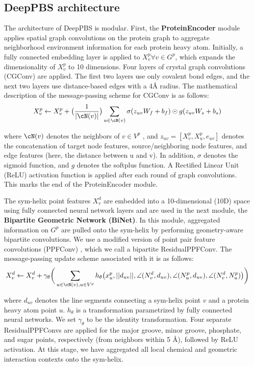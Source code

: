 \subsection{DeepPBS architecture}
The architecture of DeepPBS is modular. First, the \textbf{ProteinEncoder} module applies spatial graph convolutions on the protein graph to aggregate neighborhood environment information for each protein heavy atom. Initially, a fully connected embedding layer is applied to $X_v^p \forall v \in G^p$, which expands the dimensionality of $X_v^p$ to 10 dimensions. Four layers of crystal graph convolutions (CGConv)\citep{Xie2018} are applied. The first two layers use only covalent bond edges, and the next two layers use distance-based edges with a 4Å radius. The mathematical description of the message-passing scheme for CGConv is as follows:   
\begin{align}
X_v^p \leftarrow X_v^p + \big{(}\frac{1}{|\cN(v)|}\big{)}\sum\limits_{u\in\cN(v)}
\sigma(z_{uv}W_f + b_f)\odot g(z_{uv}W_s + b_s)
\end{align}
 
where $\cN(v)$ denotes the neighbors of $v \in V^p$ , and $z_{uv} = [X^p_v,X^p_u,e_{uv}]$ denotes the concatenation of target node features, source/neighboring node features, and edge features (here, the distance between u and v). In addition,  $\sigma$ denotes the sigmoid function, and $g$ denotes the softplus function. A Rectified Linear Unit (ReLU) \citep{Agarap2018} activation function is applied after each round of graph convolutions. This marks the end of the ProteinEncoder module.

The sym-helix point features $X_v^d$ are embedded into a 10-dimensional (10D) space using fully connected neural network layers and are used in the next module, the \textbf{Bipartite Geometric Network (BiNet)}. In this module, aggregated information on $G^p$ are pulled onto the sym-helix by performing geometry-aware bipartite convolutions. We use a modified version of point pair feature convolutions (PPFConv) \citep{Deng2018}, which we call a bipartite ResidualPPFConv. The message-passing update scheme associated with it is as follows: 
\begin{align}
X_v^d \leftarrow X_v^d + \gamma_\theta\bigg{(}\sum\limits_{u\in\cN(v),u\in V^p}h_\theta \big{(}
        x_u^p, ||d_{uv}||, \angle(N_v^d, d_{uv}), \angle(N_u^p,d_{uv}), \angle(N_v^d, N^p_u)
\big{)}
\bigg{)}
\end{align}

where $d_{uv}$ denotes the line segments connecting a sym-helix point $v$ and a protein heavy atom point $u$. $h_\theta$ is a transformation parametrized by fully connected neural networks. We set $\gamma_\theta$ to be the identity transformation. Four separate ResidualPPFConvs are applied for the major groove, minor groove, phosphate, and sugar points, respectively (from neighbors within 5 \AA), followed by ReLU activation. At this stage, we have aggregated all local chemical and geometric interaction contexts onto the sym-helix.

